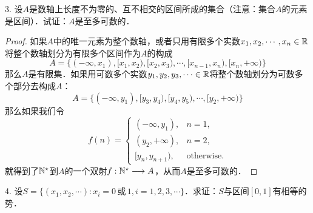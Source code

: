 3. 设$A$是数轴上长度不为零的、互不相交的区间所成的集合（注意：集合$A$的元素是区间）．试证：$A$是至多可数的．
\begin{proof}
如果$A$中的唯一元素为整个数轴，或者只用有限多个实数$x_1,x_2,\cdots, x_n \in \mathbb{R}$将整个数轴划分为有限多个区间作为$A$的构成
\begin{equation}
    A = \{ (-\infty, x_1), [x_1, x_2), [x_2, x_3), \cdots, [x_{n-1}, x_n), [x_n, +\infty) \}
\end{equation}
那么$A$是有限集．如果用可数多个实数$y_1, y_2, y_3, \cdots \in \mathbb{R}$将整个数轴划分为可数多个部分去构成$A$：
\begin{equation}
    A = \{ (-\infty, y_1), [y_3, y_4), [y_4, y_5), \cdots, [y_2, +\infty) \}
\end{equation}
那么如果我们令
\begin{equation}
    f(n) = \begin{cases}
        (-\infty, y_1), & n = 1, \\
        (y_2, +\infty), & n = 2, \\
        [y_{n}, y_{n+1}), & \text{otherwise.}
    \end{cases}
\end{equation}
就得到了$\mathbb{N}^\star$到$A$的一个双射$f: \mathbb{N}^\star \longrightarrow A$，从而$A$是至多可数的．
\end{proof}

4. 设$S = \{ (x_1, x_2, \cdots) : x_i = 0 \, \text{或} \, 1, i = 1,2,3,\cdots \}$．求证：$S$与区间$[0,1]$有相等的势．

